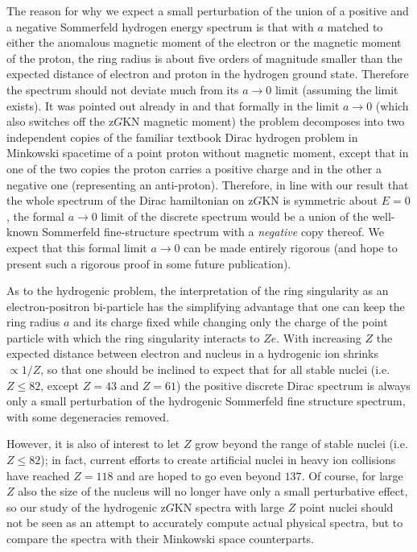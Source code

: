 \documentclass[11 pt]{article}
\renewcommand\({\left(}
\renewcommand\){\right)}
\newcommand\<{\langle}
\renewcommand\>{\rangle}
\newcommand\8{\infty}
\begin{document}
 The reason for why we expect a small perturbation of the union of a positive and a negative Sommerfeld hydrogen energy spectrum is that with 
$a$ matched to either the anomalous magnetic moment of the electron or the magnetic moment of the proton, the ring radius is about five orders
of magnitude smaller than the expected distance of electron and proton in the hydrogen ground state.
 Therefore the spectrum should not deviate much from its $a\to 0$ limit (assuming the limit exists).
 It was pointed out already in \cite{KTZzGKNDa} and \cite{KTZzGKNDb} that formally in the limit 
$a\to 0$ (which also switches off the z$G$KN magnetic moment) the problem decomposes into two independent copies of the familiar textbook 
Dirac hydrogen problem in Minkowski spacetime of a point proton without magnetic moment, except that in one of the two copies the proton
carries a positive charge and in the other a negative one (representing an anti-proton).
 Therefore,  in line with our result \cite{KTZzGKNDa} that the whole spectrum of the Dirac hamiltonian on z$G$KN is symmetric about $E=0$, 
the formal $a\to 0$ limit of the discrete spectrum would be a union of the well-known Sommerfeld fine-structure spectrum with a \emph{negative} copy thereof.
  We expect that this formal limit $a\to 0$ can be made entirely rigorous (and hope to present such a rigorous proof in some future publication). 
 
  As to the hydrogenic problem, the interpretation of the ring singularity as an electron-positron bi-particle has the simplifying advantage that
one can keep the ring radius $a$ and its charge fixed while changing only the charge of the point particle with which the ring singularity interacts to $Ze$. 
 With increasing $Z$ the expected distance between electron and nucleus in a hydrogenic ion shrinks $\propto 1/Z$, so that one should be inclined to
 expect that for all stable nuclei (i.e. $Z\leq 82$, except $Z=43$ and $Z=61$) the positive discrete Dirac spectrum is always only a small perturbation 
 of the hydrogenic Sommerfeld fine structure spectrum, with some degeneracies removed. 
 
  However, it is also of interest to let $Z$ grow beyond the range of stable nuclei (i.e. $Z\leq 82$); in fact, current efforts to create artificial nuclei in
  heavy ion collisions have reached $Z= 118$ and are hoped to go even beyond $137$.
   Of course, for large $Z$ also the size of the nucleus will no longer have only a small perturbative effect, so our study 
 of the hydrogenic z$G$KN spectra with large $Z$ point nuclei should not be seen as an attempt to accurately compute actual physical spectra, but 
 to compare the spectra with their Minkowski space counterparts.
   
\end{document}
